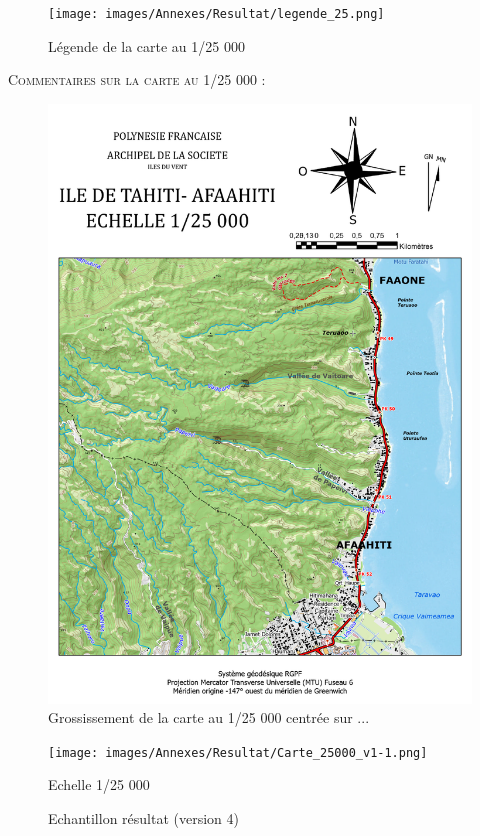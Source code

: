 \documentclass{themeensg}
\begin{document}
\begin{appendices}
\begin{figure}[!h]
\centering
\texttt{[image: images/Annexes/Resultat/legende\_25.png]}
\caption{Légende de la carte au 1/25 000}
\label{15000_legende}
\end{figure}

\vspace{3cm}
\textsc{Commentaires sur la carte au 1/25 000 :}\\

\begin{figure}[!h]
\centering
\includegraphics[width=\linewidth]{images/Annexes/Resultat/Carte_25000_A4.pdf}
\caption{Grossissement de la carte au 1/25 000 centrée sur ...}
\label{15000_gros}
\end{figure}

\begin{figure}
\centering
\texttt{[image: images/Annexes/Resultat/Carte\_25000\_v1-1.png]}%
\caption{Echantillon résultat (version 4) }
\colorbox{green!10}{Echelle 1/25 000}
\label{15000 v2}%
\end{figure}


\end{appendices}
\end{document}
